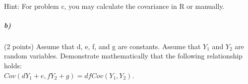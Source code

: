 \documentclass[12pt,letter]{article}
\begin{document}
\paragraph{} Hint: For problem c, you may calculate the covariance in R or manually.

\subparagraph{b)} (2 points) Assume that d, e, f, and g are constants. Assume that $Y_1$ and $Y_2$ are random variables. Demonstrate mathematically that the following relationship holds: \\
$Cov(dY_1 + e, fY_2 + g) = df Cov(Y_1, Y_2)$.
\end{document}
